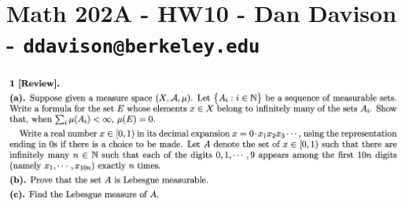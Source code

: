 \section*{Math 202A - HW10 - Dan Davison - \texttt{ddavison@berkeley.edu}}



\begin{mdframed}
  \includegraphics[width=400pt]{img/analysis--berkeley-202a-hw10-7127.png}
\end{mdframed}



